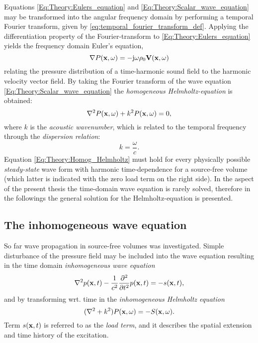 \vspace{3mm}
%
Equations \eqref{Eq:Theory:Eulers_equation} and \eqref{Eq:Theory:Scalar_wave_equation} may be transformed into the angular frequency domain by performing a temporal Fourier transform, given by \eqref{eq:temporal_fourier_transform_def}.
Applying the differentiation property of the Fourier-transform to \eqref{Eq:Theory:Eulers_equation} yields the frequency domain Euler's equation,
\begin{equation}
\nabla P(\mathbf{x},\omega) = -\mathrm{j} \omega \rho_0 \mathbf{V}(\mathbf{x},\omega)
\label{Eq:Theory:Freq_Eulers_equation}
\end{equation}
relating the pressure distribution of a time-harmonic sound field to the harmonic velocity vector field.
By taking the Fourier transform of the wave equation \eqref{Eq:Theory:Scalar_wave_equation} the \emph{homogeneous Helmholtz-equation} is obtained:
\begin{equation}
\nabla^2 P(\mathbf{x},\omega) + k^2 P(\mathbf{x},\omega) = 0,
\label{Eq:Theory:Homog_Helmholtz}
\end{equation}
where $k$ is the \emph{acoustic wavenumber}, which is related to the temporal frequency through the \emph{dispersion relation}:
\begin{equation}
k = \frac{\omega}{c}.
\end{equation}
%
Equation \eqref{Eq:Theory:Homog_Helmholtz} must hold for every physically possible \emph{steady-state} wave form with harmonic time-dependence for a source-free volume (which latter is indicated with the zero load term on the right side). 
In the aspect of the present thesis the time-domain wave equation is rarely solved, therefore in the followings the general solution for the Helmholtz-equation is presented.

\subsection{The inhomogeneous wave equation}

So far wave propagation in source-free volumes was investigated.
Simple disturbance of the pressure field may be included into the wave equation resulting in the time domain \emph{inhomogeneous wave equation}
\begin{equation}
\nabla^2 p(\mathbf{x},t) -\frac{1}{c^2}\frac{\partial^2}{\partial t^2}p(\mathbf{x},t) = -s(\mathbf{x},t),
\label{Eq:Theory:Inhomogene_wave_eq_time_domain}
\end{equation}
and by transforming wrt. time in the \emph{inhomogeneous Helmholtz equation}
\begin{equation}
(\nabla^2 + k^2 ) P(\mathbf{x},\omega ) = -S(\mathbf{x},\omega).
\end{equation}
Term $s(\mathbf{x},t)$ is referred to as the \emph{load term}, and it describes the spatial extension and time history of the excitation.

